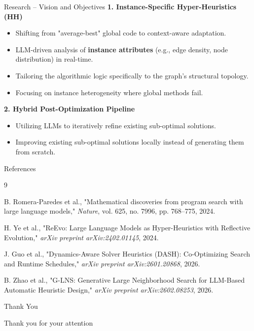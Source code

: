 \documentclass [xcolor=svgnames, t] {beamer}
\begin{document}
\begin{frame}{Research -- Vision and Objectives}
\textbf{1. Instance-Specific Hyper-Heuristics (HH)}
\begin{itemize}
    \item Shifting from "average-best" global code to context-aware adaptation.
    \item LLM-driven analysis of \textbf{instance attributes} (e.g., edge density, node distribution) in real-time.
    \item Tailoring the algorithmic logic specifically to the graph's structural topology.
    \item Focusing on instance heterogeneity where global methods fail.
\end{itemize}

\vfill
\textbf{2. Hybrid Post-Optimization Pipeline}
\begin{itemize}
    \item Utilizing LLMs to iteratively refine existing sub-optimal solutions.
    \item Improving existing sub-optimal solutions locally instead of generating them from scratch.
\end{itemize}
\end{frame}










\begin{frame}{References}
\scriptsize
\begin{thebibliography}{9}

    B. Romera-Paredes et al., "Mathematical discoveries from program search with large language models," \emph{Nature}, vol. 625, no. 7996, pp. 768–775, 2024.

    H. Ye et al., "ReEvo: Large Language Models as Hyper-Heuristics with Reflective Evolution," \emph{arXiv preprint arXiv:2402.01145}, 2024.

    J. Guo et al., "Dynamics-Aware Solver Heuristics (DASH): Co-Optimizing Search and Runtime Schedules," \emph{arXiv preprint arXiv:2601.20868}, 2026.

    B. Zhao et al., "G-LNS: Generative Large Neighborhood Search for LLM-Based Automatic Heuristic Design," \emph{arXiv preprint arXiv:2602.08253}, 2026.

\end{thebibliography}
\end{frame}































\begin{frame}{Thank You}
\vspace{1.5em}
\begin{center}
    \Large Thank you for your attention
\end{center}
\end{frame}
\end{document}
